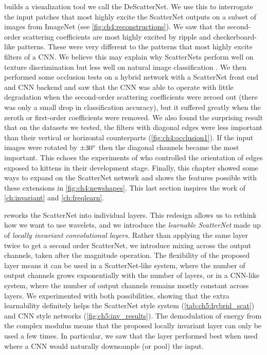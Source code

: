 \textbf{} builds a visualization tool we call the
DeScatterNet. We use this to interrogate the input patches that most highly
excite the ScatterNet outputs on a subset of images from ImageNet (see
\autoref{fig:ch4:reconstructions}). We saw that
the second-order scattering coefficients are most highly excited by ripple and
checkerboard-like patterns. These were very different to the patterns
that most highly excite filters of a CNN. We believe this may explain why
ScatterNets perform well on texture discrimination \cite{bruna_invariant_2013}
but less well on natural image classification \cite{oyallon_deep_2015}. We then
performed some occlusion tests on a hybrid network with a ScatterNet front end
and CNN backend and saw that the CNN was able to operate with little degradation when the 
second-order scattering coefficients were zeroed out (there was only a small drop in
classification accuracy), but it suffered greatly when the zeroth or first-order
coefficients were removed. We also found the surprising result that on the
datasets we tested, the filters with diagonal edges were less important than their vertical or
horizontal counterparts (\autoref{fig:ch4:occlusion1}). If the input images were
rotated by $\pm 30^{\circ}$ then the diagonal channels became the most important.
This echoes the experiments of
\citeauthor{blakemore_development_1970}\cite{blakemore_development_1970} who
controlled the orientation of edges exposed to kittens in their development
stage. Finally, this chapter showed some ways to expand on the ScatterNet
network and shows the features possible with these extensions in \autoref{fig:ch4:newshapes}.
This last section inspires the work of \autoref{ch:invariant}
and \autoref{ch:freqlearn}.

\textbf{} reworks the ScatterNet into individual layers.
This redesign allows us to rethink how we want to use wavelets, and we introduce
the \emph{learnable ScatterNet} made up of \emph{locally invariant convolutional
layers}. Rather than applying the same layer twice to get a second order
ScatterNet, we introduce mixing across the output channels, taken after the
magnitude operation. The flexibility of the proposed layer means it can be used
in a ScatterNet-like system, where the number of output channels grows
exponentially with the number of layers, or in a CNN-like system, where the
number of output channels remains mostly constant across layers. We experimented
with both possibilities, showing that the extra learnability definitely helps
the ScatterNet style system (\autoref{tab:ch5:hybrid_scat}) and CNN style
networks (\autoref{fig:ch5:inv_results}). The demodulation of energy from the complex
modulus means that the proposed locally invariant layer can only be used a few
times. In particular, we saw that the layer performed best when used where a CNN
would naturally downsample (or pool) the input.

